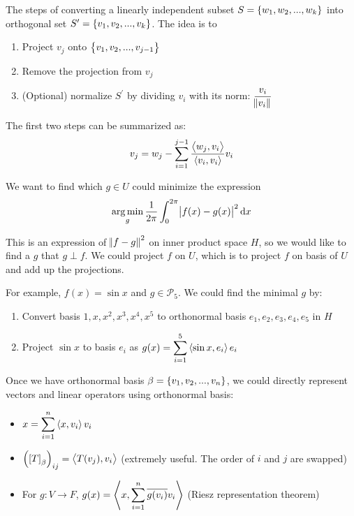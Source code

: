 \begin{theorem}\label{gram_schmidt_process}
    The steps of converting a linearly independent subset $S=\set{w_1, w_2, ..., w_k}$ into orthogonal set $S^\prime=\set{v_1, v_2, ..., v_k}$. The idea is to 
    \begin{enumerate}
        \item Project $v_{j}$ onto $\set{v_1, v_2, ..., v_{j-1}}$
        \item Remove the projection from $v_j$
        \item (Optional) normalize $S^\prime$ by dividing $v_i$ with its norm: $\displaystyle \frac{v_i}{\norm{v_i}}$
    \end{enumerate}
    
    The first two steps can be summarized as:
    \begin{equation}
        v_j = w_j - \sum_{i=1}^{j-1} \frac{\left\langle \displaystyle w_j, v_i \right\rangle}{\left\langle \displaystyle v_i, v_i \right\rangle} v_i
    \end{equation}
\end{theorem}


\begin{example}
    We want to find which $g \in U$ could minimize the expression
    \begin{equation}
        \argmin{g} \frac{1}{2\pi}\int_{0}^{2\pi} \absolutevalue{f(x) - g(x)}^2 \dif x
    \end{equation}
    
     This is an expression of $\norm{f - g}^2$ on inner product space $H$, so we would like to find a $g$ that $g \perp f$. We could project $f$ on $U$, which is to project $f$ on basis of $U$ and add up the projections.
     
     For example, $f(x) = \sin{x}$ and $g \in \mathcal{P}_5$. We could find the minimal $g$ by:
     \begin{enumerate}
         \item Convert basis $1, x, x^2, x^3, x^4, x^5$ to orthonormal basis $e_1, e_2, e_3, e_4, e_5$ in $H$
         \item Project $\sin{x}$ to basis $e_i$ as $\displaystyle g(x) = \sum_{i=1}^5 \left\langle \displaystyle \sin{x}, e_i \right\rangle e_i$
     \end{enumerate}
\end{example}

Once we have orthonormal basis $\beta = \set{v_1, v_2, ..., v_n}$,  we could directly represent vectors and linear operators using orthonormal basis:
\begin{itemize}
    \item $\displaystyle x = \sum_{i=1}^n \left\langle \displaystyle x, v_i \right\rangle v_i$
    \item $\left(\coordinate{T}_\beta\right)_{ij} = \innerproduct{T(v_j)}{v_i}$ (extremely useful. The order of $i$ and $j$ are swapped)
    \item For $g: V \rightarrow F$, $g(x) = \left\langle \displaystyle x, \sum_{i=1}^n \overline{g(v_i)} v_i \right\rangle$ (Riesz representation theorem)
\end{itemize}



